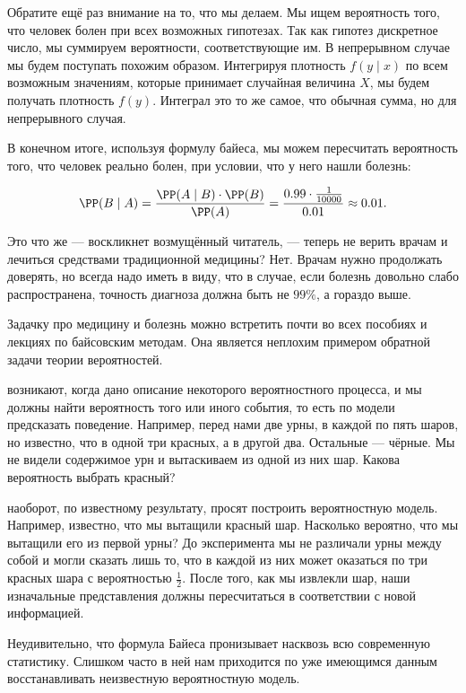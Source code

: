 \documentclass[12pt, a4paper, oneside]{article}
\begin{document}
\begin{sol}
Обратите ещё раз внимание на то, что мы делаем. Мы ищем вероятность того, что человек болен при всех возможных гипотезах. Так как гипотез дискретное число, мы суммируем вероятности, соответствующие им.  В непрерывном случае мы будем поступать похожим образом.  Интегрируя плотность $f(y \mid x)$ по всем возможным значениям, которые принимает случайная величина $X$, мы будем получать плотность $f(y)$. Интеграл это то же самое, что обычная сумма, но для непрерывного случая.

В конечном итоге, используя формулу байеса, мы можем пересчитать вероятность того, что человек реально болен, при условии, что у него нашли болезнь:

\[  \PP(B \mid A) = \frac{ \PP(A \mid B)\cdot \PP(B) }{\PP(A)}  = \frac{0.99 \cdot \frac{1}{10000}}{0.01} \approx 0.01. \]
\end{sol}


Это что же --- воскликнет возмущённый читатель, --- теперь не верить врачам и лечиться средствами традиционной медицины? Нет. Врачам нужно продолжать доверять, но всегда надо иметь в виду, что в случае, если болезнь довольно слабо распространена, точность диагноза должна быть не $99\%$, а гораздо выше.

Задачку про медицину и болезнь можно встретить почти во всех пособиях и лекциях по байсовским методам. Она является неплохим примером обратной задачи теории вероятностей. 

 возникают, когда дано описание некоторого вероятностного процесса, и мы должны найти вероятность того или иного события, то есть по модели предсказать поведение. Например, перед нами две урны, в каждой по пять шаров, но известно, что в одной три красных, а в другой два. Остальные --- чёрные.  Мы не видели содержимое урн и вытаскиваем из одной из них шар. Какова вероятность выбрать красный? 

 наоборот, по известному результату, просят построить вероятностную модель.  Например, известно, что мы вытащили красный шар. Насколько вероятно, что мы вытащили его из первой урны?  До эксперимента мы не различали урны между собой и могли сказать лишь то, что в каждой из них может оказаться по три красных шара с вероятностью $\frac{1}{2}$. После того, как мы извлекли шар,  наши изначальные представления должны пересчитаться в соответствии с новой информацией.

Неудивительно, что формула Байеса пронизывает насквозь всю современную статистику. Слишком часто в ней нам приходится по уже имеющимся данным восстанавливать неизвестную вероятностную модель. 
\end{document}
